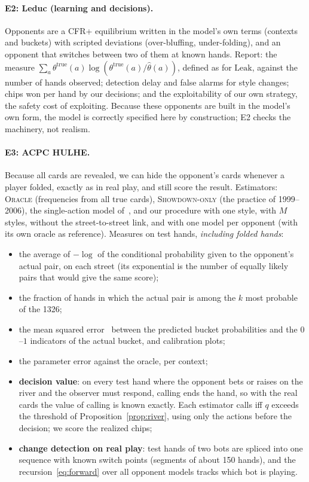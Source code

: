 \documentclass[11pt,a4paper]{article}
\newcommand{\1}{\mathbf{1}}
\newcommand{\BT}[1]{\cite[§#1]{bertsekas2000}}
\begin{document}
\paragraph{E2: Leduc (learning and decisions).} Opponents are a CFR+ equilibrium
written in the model's own terms (contexts and buckets) with scripted deviations
(over-bluffing, under-folding), and an opponent that switches between two of
them at known hands. Report: the measure
$\sum_a\theta^{\text{true}}(a)\log(\theta^{\text{true}}(a)/\hat\theta(a))$, defined
as for $\text{Leak}$, against the number of hands observed; detection delay and
false alarms for style changes; chips won per hand by our decisions; and the
exploitability of our own strategy, the safety cost of exploiting. Because these
opponents are built in the model's own form, the model is correctly specified
here by construction; E2 checks the machinery, not realism.

\paragraph{E3: ACPC HULHE.} Because all cards are revealed, we can hide the
opponent's cards whenever a player folded, exactly as in real play, and still
score the result. Estimators: \textsc{Oracle} (frequencies from all true cards),
\textsc{Showdown-only} (the practice of 1999--2006), the single-action model
of~\cite{terry2005}, and our procedure with one style, with $M$ styles, without
the street-to-street link, and with one model per opponent (with its own oracle
as reference). Measures on test hands, \emph{including folded hands}:
\begin{itemize}
  \item the average of $-\log$ of the conditional probability given to the
        opponent's actual pair, on each street (its exponential is the number of
        equally likely pairs that would give the same score);
  \item the fraction of hands in which the actual pair is among the $k$ most
        probable of the 1326;
  \item the mean squared error~\BT{4.6} between the predicted bucket
        probabilities and the $0$--$1$ indicators of the actual bucket, and
        calibration plots;
  \item the parameter error against the oracle, per context;
  \item \textbf{decision value}: on every test hand where the opponent bets or
        raises on the river and the observer must respond, calling ends the
        hand, so with the real cards the value of calling is known exactly. Each
        estimator calls iff $q$ exceeds the threshold of
        Proposition~\ref{prop:river}, using only the actions before the
        decision; we score the realized chips;
  \item \textbf{change detection on real play}: test hands of two bots are
        spliced into one sequence with known switch points (segments of about
        150 hands), and the recursion~\eqref{eq:forward} over all opponent models
        tracks which bot is playing.
\end{itemize}
\end{document}
